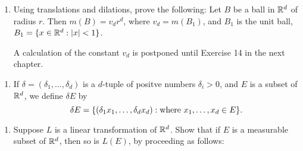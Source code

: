 \documentclass{../homework}
\begin{document}
\begin{problems}
  \begin{solution}
    \begin{problems}
    \item
    \item
    \end{problems}
  \end{solution}

  \begin{book}
    \begin{enumerate}[start=6]
    \item Using translations and dilations, prove the following: Let
      \(B\) be a ball in \(\mathbb R^d\) of radius \(r\).  Then
      \(m(B) = v_d r^d\), where \(v_d = m(B_1)\), and \(B_1\) is the
      unit ball, \(B_1 = \{x \in \mathbb R^d : \lvert x\rvert < 1\}\).

      A calculation of the constant \(v_d\) is postponed until
      Exercise 14 in the next chapter.
    \end{enumerate}
  \end{book}

  \begin{solution}
  \end{solution}

  \begin{book}
    \begin{enumerate}[start=7]
    \item If \(\delta = (\delta_1, \dots, \delta_d)\) is a \(d\)-tuple
      of positve numbers \(\delta_i > 0\), and \(E\) is a subset of
      \(\mathbb R^d\), we define \(\delta E\) by
      \[
        \delta E = \{
          (\delta_1 x_1, \dots, \delta_d x_d)
          : \text{where \(x_1, \dots, x_d \in E\)}
        \}.
      \]
    \end{enumerate}
  \end{book}

  \begin{solution}
  \end{solution}

  \begin{book}
    \begin{enumerate}[start=8]
    \item Suppose \(L\) is a linear transformation of \(\mathbb R^d\).  Show
      that if \(E\) is a measurable subset of \(\mathbb R^d\), then so is
      \(L(E)\), by proceeding as follows:
\end{enumerate}
\end{book}
\end{problems}
\end{document}
